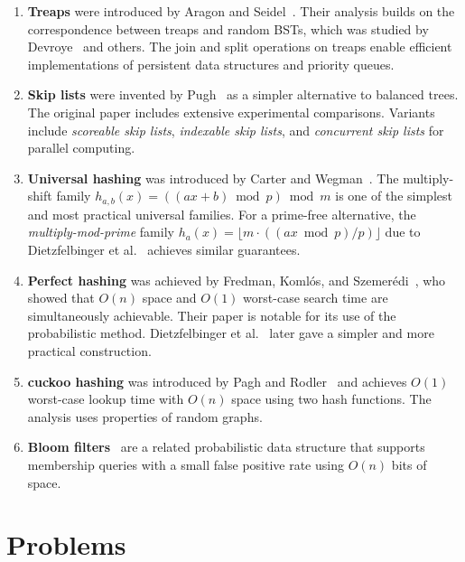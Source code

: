 \documentclass[twoside,12pt]{book}
\theoremstyle{plain}
\theoremstyle{definition}
\theoremstyle{remark}
\begin{document}
\begin{enumerate}[nosep]
    \item \textbf{Treaps} were introduced by Aragon and Seidel~\cite{aron1989}. Their analysis builds on the correspondence between treaps and random BSTs, which was studied by Devroye~\cite{devroye1988} and others. The join and split operations on treaps enable efficient implementations of persistent data structures and priority queues.
    \item \textbf{Skip lists} were invented by Pugh~\cite{pugh1990} as a simpler alternative to balanced trees. The original paper includes extensive experimental comparisons. Variants include \emph{scoreable skip lists}, \emph{indexable skip lists}, and \emph{concurrent skip lists} for parallel computing.
    \item \textbf{Universal hashing} was introduced by Carter and Wegman~\cite{carter1979}. The multiply-shift family $h_{a,b}(x) = ((ax+b) \bmod p) \bmod m$ is one of the simplest and most practical universal families. For a prime-free alternative, the \emph{multiply-mod-prime} family $h_a(x) = \lfloor m \cdot ((ax \bmod p)/p) \rfloor$ due to Dietzfelbinger et al.~\cite{dietzfelbinger1997} achieves similar guarantees.
    \item \textbf{Perfect hashing} was achieved by Fredman, Koml\'{o}s, and Szemer\'{e}di~\cite{fredman1984}, who showed that $O(n)$ space and $O(1)$ worst-case search time are simultaneously achievable. Their paper is notable for its use of the probabilistic method. Dietzfelbinger et al.~\cite{dietzfelbinger1994} later gave a simpler and more practical construction.
    \item \textbf{ cuckoo hashing} was introduced by Pagh and Rodler~\cite{pagh2004} and achieves $O(1)$ worst-case lookup time with $O(n)$ space using two hash functions. The analysis uses properties of random graphs.
    \item \textbf{Bloom filters}~\cite{bloom1970} are a related probabilistic data structure that supports membership queries with a small false positive rate using $O(n)$ bits of space.
\end{enumerate}

\section*{Problems}
\end{document}
